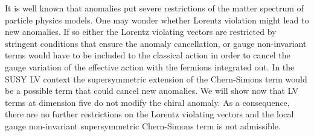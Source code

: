 \documentclass[12pt]{revtex4}
\begin{document}
It is well known that anomalies put severe restrictions of the matter
spectrum of particle physics models. One may wonder whether Lorentz
violation might lead to new anomalies. If so either the Lorentz
violating vectors are restricted by stringent conditions that ensure the
anomaly cancellation, or gauge non-invariant terms would have to be
included to the classical action in order to cancel the gauge variation of the
effective action with the fermions integrated out. In the
SUSY LV context the supersymmetric extension
of the Chern-Simons term would be a possible term that could cancel new
anomalies. We will show now that LV terms at dimension five
do not modify the chiral anomaly. As a consequence, there are no
further restrictions on the Lorentz violating vectors and the 
local gauge non-invariant supersymmetric
Chern-Simons term is not admissible. 
\end{document}

